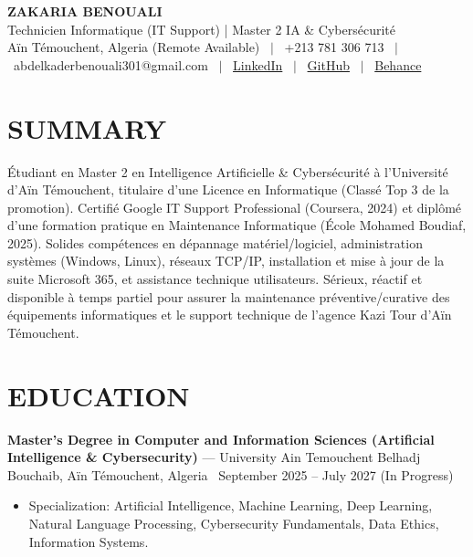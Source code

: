 \documentclass[10.5pt, letterpaper]{article}
\newcommand{\entry}[4]{%
  \noindent\textbf{#1} --- #3, #4 \textbar\ #2\par
  \vspace{2pt}
}
\newcommand{\resumeItem}[1]{\item #1}
\begin{document}
\RaggedRight

\begin{center}
  {\Huge \textbf{ZAKARIA BENOUALI}}\\[4pt]
  {\large Technicien Informatique (IT Support) | Master 2 IA \& Cybersécurité}\\[4pt]
  Aïn Témouchent, Algeria (Remote Available) \ $|$ \ +213 781 306 713 \ $|$ \ abdelkaderbenouali301@gmail.com \ $|$ \ \href{https://www.linkedin.com/in/benouali-abdelkader-yahia-zakaria-4a917a247}{LinkedIn} \ $|$ \ \href{https://github.com/benoualiabdelkader}{GitHub} \ $|$ \ \href{https://www.behance.net/abdelkaderbeno}{Behance}
\end{center}

\vspace{2pt}

\section{SUMMARY}
Étudiant en Master 2 en Intelligence Artificielle \& Cybersécurité à l'Université d'Aïn Témouchent, titulaire d'une Licence en Informatique (Classé Top 3 de la promotion). Certifié Google IT Support Professional (Coursera, 2024) et diplômé d'une formation pratique en Maintenance Informatique (École Mohamed Boudiaf, 2025). Solides compétences en dépannage matériel/logiciel, administration systèmes (Windows, Linux), réseaux TCP/IP, installation et mise à jour de la suite Microsoft 365, et assistance technique utilisateurs. Sérieux, réactif et disponible à temps partiel pour assurer la maintenance préventive/curative des équipements informatiques et le support technique de l'agence Kazi Tour d'Aïn Témouchent.

\section{EDUCATION}

\entry{Master's Degree in Computer and Information Sciences (Artificial Intelligence \& Cybersecurity)}{September 2025 -- July 2027 (In Progress)}{University Ain Temouchent Belhadj Bouchaib}{Aïn Témouchent, Algeria}
\begin{itemize}
  \resumeItem{Specialization: Artificial Intelligence, Machine Learning, Deep Learning, Natural Language Processing, Cybersecurity Fundamentals, Data Ethics, Information Systems.}
\end{itemize}
\end{document}
